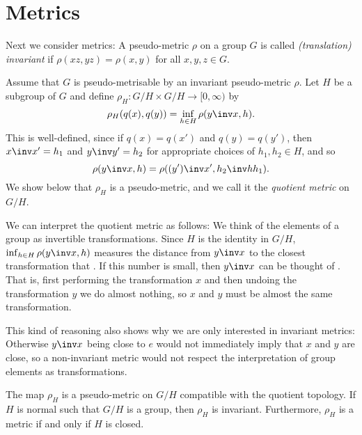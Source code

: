 \documentclass[article, a4paper, 11pt, oneside]{memoir}
\numberwithin{equation}{chapter}
\begin{document}
\section{Metrics}

Next we consider metrics: A pseudo-metric $\rho$ on a group $G$ is called \emph{(translation) invariant} if $\rho(xz,yz) = \rho(x,y)$ for all $x,y,z \in G$.

Assume that $G$ is pseudo-metrisable by an invariant pseudo-metric $\rho$. Let $H$ be a subgroup of $G$ and define $\rho_H \colon G/H \times G/H \to [0,\infty)$ by
%
\begin{equation*}
    \rho_H(q(x), q(y))
        = \inf_{h \in H} \rho(y\inv x, h).
\end{equation*}
%
This is well-defined, since if $q(x) = q(x')$ and $q(y) = q(y')$, then $x\inv x' = h_1$ and $y\inv y' = h_2$ for appropriate choices of $h_1,h_2 \in H$, and so
%
\begin{equation*}
    \rho(y\inv x, h)
        = \rho((y')\inv x', h_2\inv h h_1).
\end{equation*}
%
We show below that $\rho_H$ is a pseudo-metric, and we call it the \emph{quotient metric} on $G/H$.

We can interpret the quotient metric as follows: We think of the elements of a group as invertible transformations. Since $H$ is the identity in $G/H$, $\inf_{h \in H} \rho(y\inv x, h)$ measures the distance from $y\inv x$ to the closest transformation that . If this number is small, then $y\inv x$ can be thought of . That is, first performing the transformation $x$ and then undoing the transformation $y$ we do almost nothing, so $x$ and $y$ must be almost the same transformation.

This kind of reasoning also shows why we are only interested in invariant metrics: Otherwise $y\inv x$ being close to $e$ would not immediately imply that $x$ and $y$ are close, so a non-invariant metric would not respect the interpretation of group elements as transformations.


\begin{proposition}
    \label{thm:coset-space-metric}
    The map $\rho_H$ is a pseudo-metric on $G/H$ compatible with the quotient topology. If $H$ is normal such that $G/H$ is a group, then $\rho_H$ is invariant. Furthermore, $\rho_H$ is a metric if and only if $H$ is closed.
\end{proposition}

\newcommand{\calB}{\mathcal{B}}
\end{document}
